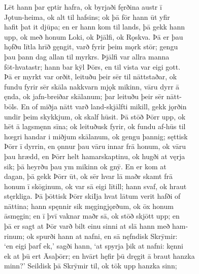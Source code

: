 \documentclass[12pt,letterpaper]{book}
\begin{document}
\begin{linenumbers}
Lēt hann þar ęptir hafra, ok byrjaði fęrðina austr ī\\
Jǫtun-heima, ok alt til hafsins; ok þā fōr hann ūt yfir\\
hafit þat it djūpa; en er hann kom til lands, þā gekk hann\\
upp, ok með honum Loki, ok Þjālfi, ok Rǫskva.  Þā er þau\\
hǫfðu lītla hrīð gęngit, varð fyrir þeim mǫrk stōr; gengu\\
þau þann dag allan til myrkrs.  Þjālfi var allra manna\\
fōt-hvatastr; hann bar kȳl Þōrs, en til vista var eigi gott.\\
Þā er myrkt var orðit, leituðu þeir sēr til nāttstaðar, ok\\
fundu fyrir sēr skāla nakkvarn mjǫk mikinn, vāru dyrr ā\\
ęnda, ok jafn-breiðar skālanum; þar leituðu þeir sēr nātt-\\
bōls.  En of miðja nātt varð land-skjālfti mikill, gekk jǫrðin\\
undir þeim skykkjum, ok skalf hūsit.  Þā stōð Þōrr upp, ok\\
hēt ā lagsmęnn sīna; ok leituðusk fyrir, ok fundu af-hūs til\\
hœgri handar i miðjum skālanum, ok gengu þannig; sęttisk\\
Þōrr ī dyrrin, en ǫnnur þau vāru innar frā honum, ok vāru\\
þau hrædd, en Þōrr helt hamarskaptinu, ok hugði at vęrja\\
sik; þā heyrðu þau ym mikinn ok gnȳ.  En er kom at\\
dagan, þā gekk Þōrr ūt, ok sēr hvar lā maðr skamt frā\\
honum ī skōginum, ok var sā eigi lītill; hann svaf, ok hraut\\
stęrkliga.  Þā þōttisk Þōrr skiIja hvat lātum verit hafði of\\
nāttina; hann spęnnir sik męgingjǫrðum, ok ōx honum\\
āsmęgin; en ī þvī vaknar maðr sā, ok stōð skjōtt upp; en\\
þā er sagt at Þōr varð bilt einu sinni at slā hann með ham-\\
rinum; ok spurði hann at nafni, en sā nęfndisk Skrȳmir:\\
`en eigi þarf ek,' sagði hann, `at spyrja þik at nafni: kęnni\\
ek at þū ert Āsaþōrr; en hvārt hęfir þū dręgit ā braut hanzka\\
minn?'  Seildisk þā Skrȳmir til, ok tōk upp hanzka sinn;\\

\end{linenumbers}
\end{document}

